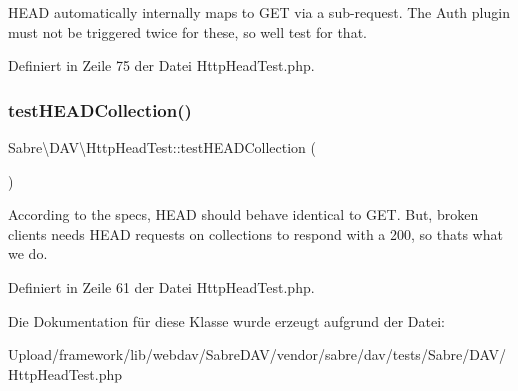 H\+E\+AD automatically internally maps to G\+ET via a sub-\/request. The Auth plugin must not be triggered twice for these, so we\textquotesingle{}ll test for that. 

Definiert in Zeile 75 der Datei Http\+Head\+Test.\+php.

\mbox{\label{class_sabre_1_1_d_a_v_1_1_http_head_test_a28bbb6fa800b397a13499c2de3f3bab0}} 
\subsubsection{\texorpdfstring{test\+H\+E\+A\+D\+Collection()}{testHEADCollection()}}
{\footnotesize\ttfamily Sabre\textbackslash{}\+D\+A\+V\textbackslash{}\+Http\+Head\+Test\+::test\+H\+E\+A\+D\+Collection (\begin{DoxyParamCaption}{ }\end{DoxyParamCaption})}

According to the specs, H\+E\+AD should behave identical to G\+ET. But, broken clients needs H\+E\+AD requests on collections to respond with a 200, so that\textquotesingle{}s what we do. 

Definiert in Zeile 61 der Datei Http\+Head\+Test.\+php.



Die Dokumentation für diese Klasse wurde erzeugt aufgrund der Datei\+:\begin{DoxyCompactItemize}
\item 
Upload/framework/lib/webdav/\+Sabre\+D\+A\+V/vendor/sabre/dav/tests/\+Sabre/\+D\+A\+V/Http\+Head\+Test.\+php\end{DoxyCompactItemize}
